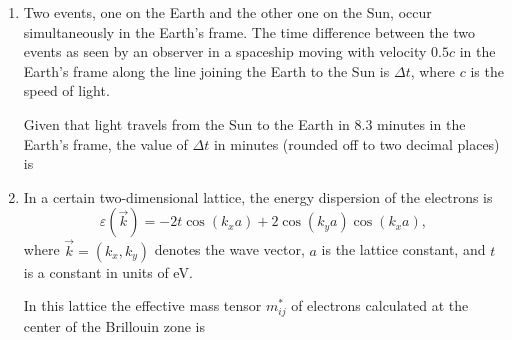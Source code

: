 \documentclass[journal,12pt,onecolumn]{IEEEtran}
\begin{document}
\begin{enumerate}[itemsep=0.45cm]
  \item Two events, one on the Earth and the other one on the Sun, occur simultaneously in the Earth's frame. The time difference between the two events as seen by an observer in a spaceship moving with velocity $0.5c$ in the Earth's frame along the line joining the Earth to the Sun is $\Delta t$, where $c$ is the speed of light.  

  Given that light travels from the Sun to the Earth in $8.3$ minutes in the Earth's frame, the value of $\Delta t$ in minutes (rounded off to two decimal places) is  

  \hfill{}

  
  \item In a certain two-dimensional lattice, the energy dispersion of the electrons is  
  \[
    \varepsilon(\vec{k}) = -2t\cos(k_x a) + 2\cos(k_y a)\cos(k_x a),
  \]
  where $\vec{k} = (k_x, k_y)$ denotes the wave vector, $a$ is the lattice constant, and $t$ is a constant in units of eV.  

  In this lattice the effective mass tensor $m^*_{ij}$ of electrons calculated at the center of the Brillouin zone is

  \hfill{}
 

    
\end{enumerate}
\end{document}
